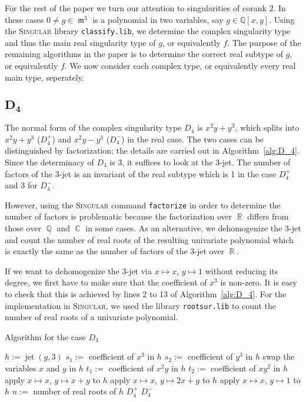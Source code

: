 \documentclass[noend]{amsproc}
\theoremstyle{definition}
\newcommand{\Singular}{\textsc{Singular}}
\DeclareMathOperator{\m}{\mathfrak{m}}
\DeclareMathOperator{\jet}{jet}
\DeclareMathOperator{\Q}{\mathbb{Q}}
\DeclareMathOperator{\R}{\mathbb{R}}
\DeclareMathOperator{\C}{\mathbb{C}}
\begin{document}
For the rest of the paper we turn our attention to singularities of corank $2$.
In these cases $0\neq g\in\m^3$ is a polynomial in two variables, say
$g\in\mathbb Q[x,y]$. Using the \textsc{Singular} library {\tt classify.lib},
we determine the complex singularity type and thus the main real singularity
type of $g$, or equivalently $f$. The purpose of the remaining algorithms in
the paper is to determine the correct real subtype of $g$, or equivalently $f$.
We now consider each complex type, or equivalently every real main type,
seperately.

\subsection{$\boldsymbol{D_4}$}

The normal form of the complex singularity type $D_4$ is $x^2y+y^3$, which
splits into $x^2y+y^3$ ($D_4^+$) and $x^2y-y^3$ ($D_4^-$) in the real case.
The two cases can be distinguished by factorization; the details are carried
out in Algorithm~\ref{alg:D_4}. Since the determinacy of $D_4$ is $3$, it
suffices to look at the $3$-jet. The number of factors of the 3-jet is an
invariant of the real subtype which is 1 in the case $D_4^+$ and 3 for $D_4^-$.

However, using the \Singular{} command \verb+factorize+ in order to determine
the number of factors is problematic because the factorization over $\R$
differs from those over $\Q$ and $\C$ in some cases. As an alternative, we
dehomogenize the 3-jet and count the number of real roots of the resulting
univariate polynomial which is exactly the same as the number of factors of the
3-jet over $\R$.

If we want to dehomogenize the 3-jet via $x\mapsto x$, $y\mapsto 1$ without
reducing its degree, we first have to make sure that the coefficient of $x^3$
is non-zero. It is easy to check that this is achieved by lines 2 to 13 of
Algorithm~\ref{alg:D_4}. For the implementation in \Singular{}, we used the
library \texttt{rootsur.lib} \citep{roots} to count the number of real roots
of a univariate polynomial.

\begin{algorithm}[ht]
\caption{\label{alg:D_4}\label{D[4]} Algorithm for the case $D_4$}
\begin{algorithmic}[1]

\Require{$g\in \m^3\subset\mathbb Q[x,y]$ of complex singularity type $D_4$}
\State $h := \jet(g,3)$
\State $s_1:=$ coefficient of ${x^3}$ in $h$
\State $s_2 :=$ coefficient of ${y^3}$ in $h$
\State swap the variables $x$ and $y$ in $h$
\Else
\State $t_1:=$ coefficient of ${x^2y}$ in $h$
\State $t_2:=$ coefficient of ${xy^2}$ in $h$
\State apply $x\mapsto x$, $y\mapsto x+y$ to $h$
\Else
\State apply $x\mapsto x$, $y\mapsto 2x+y$ to $h$
\EndIf
\EndIf
\EndIf
\State apply $x\mapsto x$, $y\mapsto 1$ to $h$
\State $n :=$ number of real roots of $h$
\Return $D_4^+$
\Else
\Return $D_4^-$
\EndIf

\end{algorithmic}
\end{algorithm}
\end{document}
